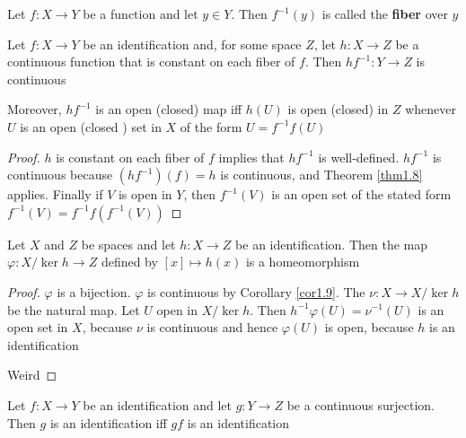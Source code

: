 \documentclass[11pt]{article}
\begin{document}
\begin{definition}[]
Let \(f:X\to Y\) be a function and let \(y\in Y\). Then \(f^{-1}(y)\) is called the \textbf{fiber} over \(y\)
\end{definition}

\begin{corollary}[]
\label{cor1.9}
Let \(f:X\to Y\) be an identification and, for some space \(Z\), let \(h:X\to Z\) be a continuous
function that is constant on each fiber of \(f\). Then \(hf^{-1}:Y\to Z\) is continuous
\begin{center}\end{center}
Moreover, \(hf^{-1}\) is an open (closed) map iff \(h(U)\) is open (closed) in \(Z\)
whenever \(U\) is an open (closed ) set in \(X\) of the form \(U=f^{-1}f(U)\)
\end{corollary}

\begin{proof}
\(h\) is constant on each fiber of \(f\) implies that \(hf^{-1}\) is well-defined. \(hf^{-1}\) is
continuous because \((hf^{-1})(f)=h\) is continuous, and Theorem \ref{thm1.8} applies. Finally
if \(V\) is open in \(Y\), then \(f^{-1}(V)\) is an open set of the stated form \(f^{-1}(V)=f^{-1}f(f^{-1}(V))\)
\end{proof}

\begin{corollary}[]
Let \(X\) and \(Z\) be spaces and let \(h:X\to Z\) be an identification. Then the
map \(\varphi:X/\ker h\to Z\) defined by \([x]\mapsto h(x)\) is a homeomorphism
\end{corollary}

\begin{proof}
\(\varphi\) is a bijection. \(\varphi\) is continuous by Corollary \ref{cor1.9}. The \(\nu:X\to X/\ker h\) be the natural
map. Let \(U\) open in \(X/\ker h\). Then \(h^{-1}\varphi(U)=\nu^{-1}(U)\) is an open set in \(X\),
because \(\nu\) is continuous and hence \(\varphi(U)\) is open, because \(h\) is an identification

Weird
\end{proof}

\begin{exercise}
\label{ex1.10}
Let \(f:X\to Y\) be an identification and let \(g:Y\to Z\) be a continuous surjection. Then \(g\) is
an identification iff \(gf\) is an identification
\end{exercise}
\end{document}
